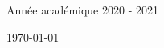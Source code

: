 \documentclass[ 
11pt, %
french, %
singlespacing, %
parskip, %
headsepline, %
openany, %
]{MastersDoctoralThesis} %
\numberwithin{theorem}{section}  %
\begin{document}
\begin{titlepage}
\begin{center}
\vspace*{.04\textheight}
\large Année académique 2020 - 2021

\vfill

{\large \today}\\[4cm] %

\end{center}
\end{titlepage}

%
%
%
%
%

%
%
%
\end{document}

